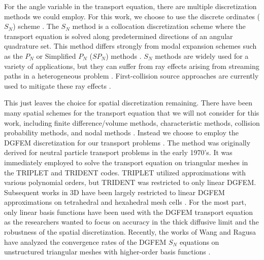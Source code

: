 For the angle variable in the transport equation, there are multiple discretization methods we could employ. For this work, we choose to use the discrete ordinates ($S_N$) scheme \cite{carlson1968computing,lewis1984computational}. The $S_N$ method is a collocation discretization scheme where the transport equation is solved along predetermined directions of an angular quadrature set. This method differs strongly from modal expansion schemes such as the $P_N$ or Simplified $P_N$ ($SP_N$) methods \cite{bell1979nuclear,gelbard1960application}. $S_N$ methods are widely used for a variety of applications, but they can suffer from ray effects arising from streaming paths in a heterogeneous problem \cite{lathrop1968ray}. First-collision source approaches are currently used to mitigate these ray effects \cite{lathrop1971remedies,morel_rayeffects}.

This just leaves the choice for spatial discretization remaining. There have been many spatial schemes for the transport equation that we will not consider for this work, including finite difference/volume methods, characteristic methods, collision probability methods, and nodal methods \cite{bell1979nuclear,morel1999self,askew1972characteristics,alcouffe1981review,sanchez1982review}. Instead we choose to employ the DGFEM discretization for our transport problems \cite{reed1973triangularmesh,lesaint1974finite}. The method was originally derived for neutral particle transport problems in the early 1970's. It was immediately employed to solve the transport equation on triangular meshes in the TRIPLET \cite{reed1973triplet} and TRIDENT \cite{seed1977trident,seed1978trident} codes. TRIPLET utilized approximations with various polynomial orders, but TRIDENT was restricted to only linear DGFEM. Subsequent works in 3D have been largely restricted to linear DGFEM approximations on tetrahedral and hexahedral mesh cells \cite{wareing2001discontinuous,morel2005s}. For the most part, only linear basis functions have been used with the DGFEM transport equation as the researchers wanted to focus on accuracy in the thick diffusive limit and the robustness of the spatial discretization. Recently, the works of Wang and Ragusa have analyzed the convergence rates of the DGFEM $S_N$ equations on unstructured triangular meshes with higher-order basis functions \cite{wang2009convergence,wang2009high}.

